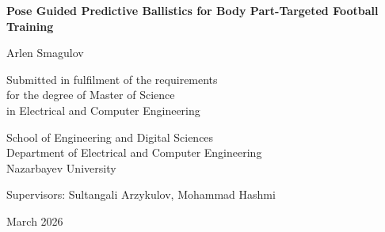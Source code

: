 \begin{titlepage}
\thispagestyle{empty}
\begin{center}
{\Large\bfseries Pose Guided Predictive Ballistics for Body Part-Targeted Football Training \par}
\vspace{1.5cm}
{\large Arlen Smagulov\par}
\vspace{0.6cm}
{\large Submitted in fulfilment of the requirements\\for the degree of Master of Science\\in Electrical and Computer Engineering\par}
\vspace{1.2cm}
{\large School of Engineering and Digital Sciences\\Department of Electrical and Computer Engineering\\Nazarbayev University\par}
\vspace{1.0cm}
{\large Supervisors: Sultangali Arzykulov, Mohammad Hashmi\par}
\vfill
{\large March 2026\par}
\end{center}
\end{titlepage}
